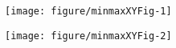 \documentclass[11pt]{article}\usepackage[]{graphicx}\usepackage[]{color}
\newcommand{\hlkwc}[1]{\textcolor[rgb]{0.333,0.667,0.333}{#1}}%
\newcommand{\hlkwd}[1]{\textcolor[rgb]{0.737,0.353,0.396}{\textbf{#1}}}%
\newenvironment{knitrout}{}{} %
\newcommand{\func}[1]{\texttt{\hlkwd{#1}}}
\newcommand{\argument}[1]{\texttt{\hlkwc{#1}}}
\begin{document}
\begin{center}
\begin{knitrout}\small
{}\color{fgcolor}

{\centering \texttt{[image: figure/minmaxXYFig-1]} 

}




{\centering \texttt{[image: figure/minmaxXYFig-2]} 

}



\end{knitrout}
\end{center}
%
%
%
%
%
%
%
%
%
%
\end{document}
